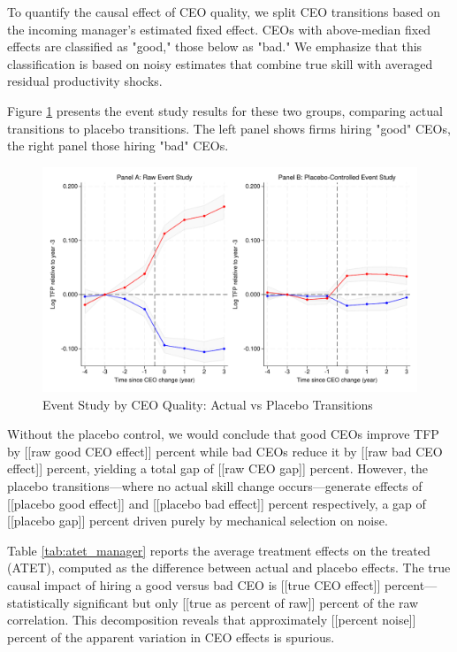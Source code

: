 \documentclass[11pt,a4paper]{article}
\begin{document}
To quantify the causal effect of CEO quality, we split CEO transitions based on the incoming manager's estimated fixed effect. CEOs with above-median fixed effects are classified as "good," those below as "bad." We emphasize that this classification is based on noisy estimates that combine true skill with averaged residual productivity shocks.

Figure \ref{fig:event_study_split} presents the event study results for these two groups, comparing actual transitions to placebo transitions. The left panel shows firms hiring "good" CEOs, the right panel those hiring "bad" CEOs.

\begin{figure}[htbp]
\centering
\includegraphics[width=\textwidth]{figure/event_study.pdf}
\caption{Event Study by CEO Quality: Actual vs Placebo Transitions}
\label{fig:event_study_split}
\end{figure}

Without the placebo control, we would conclude that good CEOs improve TFP by [[raw good CEO effect]] percent while bad CEOs reduce it by [[raw bad CEO effect]] percent, yielding a total gap of [[raw CEO gap]] percent. However, the placebo transitions—where no actual skill change occurs—generate effects of [[placebo good effect]] and [[placebo bad effect]] percent respectively, a gap of [[placebo gap]] percent driven purely by mechanical selection on noise.

Table \ref{tab:atet_manager} reports the average treatment effects on the treated (ATET), computed as the difference between actual and placebo effects. The true causal impact of hiring a good versus bad CEO is [[true CEO effect]] percent—statistically significant but only [[true as percent of raw]] percent of the raw correlation. This decomposition reveals that approximately [[percent noise]] percent of the apparent variation in CEO effects is spurious.
\end{document}
